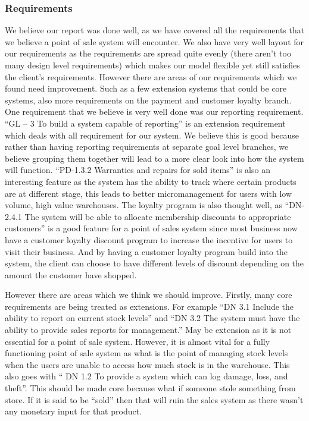 \documentclass[a4paper]{article}
\begin{document}
\subsubsection{Requirements}
We believe our report was done well, as we have covered all the requirements that we believe a point of sale system will encounter. We also have very well layout for our requirements as the requirements are spread quite evenly (there aren’t too many design level requirements) which makes our model flexible yet still satisfies the client’s requirements. However there are areas of our requirements which we found need improvement. Such as a few extension systems that could be core systems, also more requirements on the payment and customer loyalty branch.
One requirement that we believe is very well done was our reporting requirement. “GL – 3 To build a system capable of reporting” is an extension requirement which deals with all requirement for our system. We believe this is good because rather than having reporting requirements at separate goal level branches, we believe grouping them together will lead to a more clear look into how the system will function.  “PD-1.3.2 Warranties and repairs for sold items” is also an interesting feature as the system has the ability to track where certain products are at different stage, this leads to better micromanagement for users with low volume, high value warehouses. The loyalty program is also thought well, as “DN-2.4.1 The system will be able to allocate membership discounts to appropriate customers” is a good feature for a point of sales system since most business now have a customer loyalty discount program to increase the incentive for users to visit their business. And by having a customer loyalty program build into the system, the client can choose to have different levels of discount depending on the amount the customer have shopped.
 
However there are areas which we think we should improve. Firstly, many core requirements are being treated as extensions. For example “DN 3.1 Include the ability to report on current stock levels” and “DN 3.2 The system must have the ability to provide sales reports for management.” May be extension as it is not essential for a point of sale system. However, it is almost vital for a fully functioning point of sale system as what is the point of managing stock levels when the users are unable to access how much stock is in the warehouse. This also goes with “ DN 1.2 To provide a system which can log damage, loss, and theft”. This should be made core because what if someone stole something from store. If it is said to be “sold” then that will ruin the sales system as there wasn’t any monetary input for that product.
 
\end{document}
